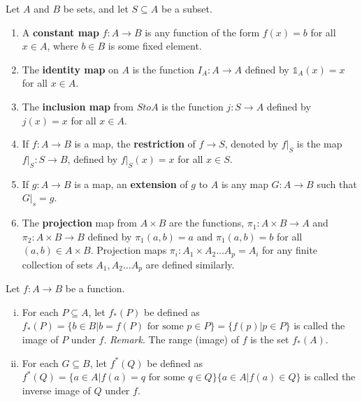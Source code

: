 \documentclass[a4paper,english,12pt]{article}
\begin{document}
\begin{defn}
Let $A$ and $B$ be sets, and let $S \subseteq A$ be a subset. 
\begin{enumerate}
 \item  A \textbf{constant map} $f: A \to B$ is any function of the form $f(x) = b$ for all $x \in A$, where $b \in B$ is some fixed element.
 
 \item  The \textbf{identity map} on $A$ is the function $I_{A}: A \to A$ defined by $\mathbb{1}_{A}(x) = x$ for all $x \in A$.

 \item  The \textbf{inclusion map} from $S to A$ is the function $j: S \to A$ defined by $j(x) = x$ for all $x \in A$.

 \item If $f: A \to B$ is a map, the \textbf{restriction} of $f \to S$, denoted by $f |_{S}$ is the map $f|_{S}: S \to B$, defined by $f|_{S}(x)= x$ for all 
 $x \in S$.

 \item  If $g: A \to B$ is a map, an \textbf{extension} of $g$ to $A$ is any map $G: A \to B$ such that $G|_{s} = g$.

 \item   The \textbf{projection} map from $A \times B$ are the functions, $\pi_{1}: A \times B \to A$ and $\pi_{2}: A \times B \to B$ defined by 
 $\pi_{1}(a, b) = a$ and $\pi_{1}(a, b) = b$ for all $(a,b) \in A \times B$. Projection maps $\pi_{i}: A_{1} \times A_{2} \dots A_{p} = A_{i}$ for 
 any finite collection of sets $A_{1}, A_{2} \dots A_{p}$ are defined similarly.

\end{enumerate}
\end{defn}


\begin{defn} 
 Let $f: A \to B$ be a function.
 \begin{enumerate} [i)]
  \item For each $P \subseteq A$, let $f_{*}(P)$ be defined as $f_{*}(P) = \{ b \in B | b = f(P) \text{ for some } p \in P \} = \{ f(p) | p \in P\}$ is called 
  the image of $P$ under $f$.
  \emph{Remark}. The range (image) of $f$ is the set $f_{*}(A)$.
  \item For each $G \subseteq B$, let $f^{*}(Q)$ be defined as $f^{*}(Q) = \{ a \in A | f(a) = q \text{ for some } q \in Q\} \{ a \in A | f(a) \in Q \}$ is called 
  the inverse image of $Q$ under $f$.
 \end{enumerate}
\end{defn}






\vspace{10cm}
\end{document}
